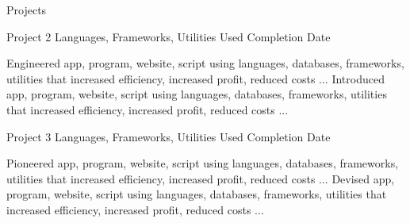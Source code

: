 \documentclass[11pt]{cv_template}
\begin{document}
\begin{cv}
\begin{cvsection}{Projects}
\begin{cvsubsection}
\end{cvsubsection}


\begin{cvsubsection}
{Project 2} {Languages, Frameworks, Utilities Used} {Completion Date} {}

\listitem Engineered app, program, website, script using languages,       databases, frameworks, utilities that increased efficiency, increased    profit,  reduced costs ...
\listitem Introduced app, program, website, script using languages,       databases, frameworks, utilities that increased efficiency, increased    profit,  reduced costs ...

\end{cvsubsection}


\begin{cvsubsection}
 {Project 3} {Languages, Frameworks, Utilities Used} {Completion Date} {}

\listitem Pioneered app, program, website, script using languages, databases, frameworks, utilities that increased efficiency, increased profit, reduced   costs ...
\listitem Devised app, program, website, script using languages, databases, frameworks, utilities that increased efficiency, increased profit, reduced   costs ...

\end{cvsubsection}


\end{cvsection}


\end{cv}

\end{document}
